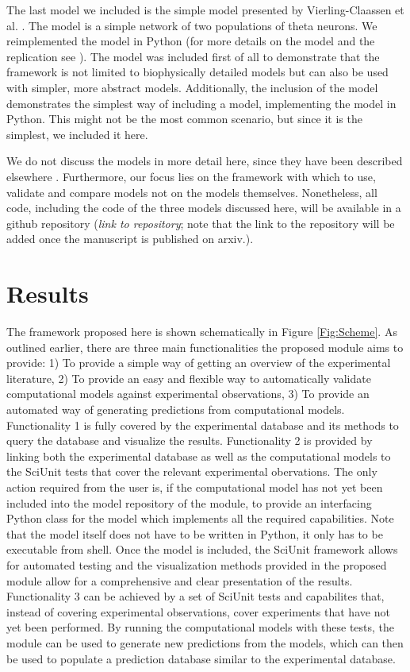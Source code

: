\documentclass[a4paper,10pt]{article}
\begin{document}
The last model we included is the simple model presented by Vierling-Claassen et al. \cite{Vierling2008}. The model is a simple network of two populations of theta neurons. 
We reimplemented the model in Python (for more details on the model and the replication see \cite{Metzner2017}).
The model
was included first of all to demonstrate that the framework is not limited to biophysically detailed models but can also be used with simpler, more abstract models.
Additionally, the inclusion of the model demonstrates the simplest way of including a model, implementing the model in Python. This might not be the most common scenario, but 
since it is the simplest, we included it here.

We do not discuss the models in more detail here, since they have been described elsewhere \cite{Beeman2013,Metzner2016,Vierling2008,Metzner2017}. Furthermore, our focus lies on the framework with which to use, validate and compare
models not on the models themselves. Nonetheless, all code, including the code of the three models discussed here, will be available in a github repository (\textit{link to repository}; note that the link to the repository 
will be added once the manuscript is published on arxiv.).


\section{Results}

The framework proposed here is shown schematically in Figure \ref{Fig:Scheme}. As outlined earlier, there are three main functionalities the proposed module aims to provide: 1) To provide a simple way of getting an overview
of the experimental literature, 2) To provide an easy and flexible way to automatically validate computational models against experimental observations, 3) To provide an automated way of generating predictions from computational
models. Functionality 1 is fully covered by the experimental database and its methods to query the database and visualize the results. Functionality 2 is provided by linking both the experimental database as well as the 
computational models to the SciUnit tests that cover the relevant experimental obervations. The only action required from the user is, if the computational model has not yet been included into the model repository of the module, 
to provide an interfacing Python class for the model which implements all the required capabilities. Note that the model itself does not have to be written in Python, it only has to be executable from shell. Once the model is
included, the SciUnit framework allows for automated testing and the visualization methods provided in the proposed module allow for a comprehensive and clear presentation of the results. Functionality 3 can be achieved by
a set of SciUnit tests and capabilites that, instead of covering experimental observations, cover experiments that have not yet been performed. By running the computational models with these tests, 
the module can be used to generate new predictions from the models, which can then be used to populate a prediction database similar to the experimental database.
\end{document}
